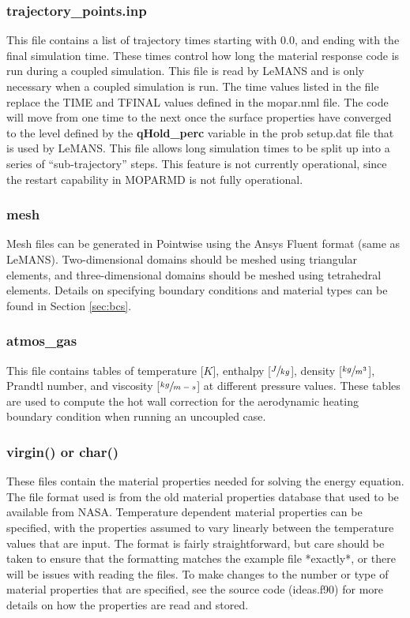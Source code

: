 \documentclass[]{article}
\begin{document}
\subsubsection{trajectory\_points.inp}
This file contains a list of trajectory times starting with 0.0, and ending with the final simulation time. These times control how long the material response code is run during a coupled simulation.  This file is read by LeMANS and is only necessary when a coupled simulation is run. The time values listed in the file replace the TIME and TFINAL values defined in the mopar.nml file.  The code will move from one time to the next once the surface properties have converged to the level defined by the \textbf{qHold\_perc} variable in the prob setup.dat file that is used by LeMANS. This file allows long simulation times to be split up into a series of ``sub-trajectory'' steps.  This feature is not currently operational, since the restart capability in MOPARMD is not fully operational.

\subsubsection{mesh}
Mesh files can be generated in Pointwise using the Ansys Fluent format (same as LeMANS). Two-dimensional domains should be meshed using triangular elements, and three-dimensional domains should be meshed using tetrahedral elements. Details on specifying boundary conditions and material types can be found in Section \ref{sec:bcs}.

\subsubsection{atmos\_gas}
This file contains tables of temperature [\(K\)], enthalpy [\(\sfrac{J}{kg}\)], density [\(\sfrac{kg}{m^3}\)], Prandtl number, and viscosity [\(\sfrac{kg}{m-s}\)] at different pressure values. These tables are used to compute the hot wall correction for the aerodynamic heating boundary condition when running an uncoupled case.
      
\subsubsection{virgin() or char()}
These files contain the material properties needed for solving the energy equation. The file format used is from the old material properties database that used to be available from NASA. Temperature dependent material properties can be specified, with the properties assumed to vary linearly between the temperature values that are input. The format is fairly straightforward, but care should be taken to ensure that the formatting matches the example file *exactly*, or there will be issues with reading the files. To make changes to the number or type of material properties that are specified, see the source code (ideas.f90) for more details on how the properties are read and stored.
	
\end{document}
